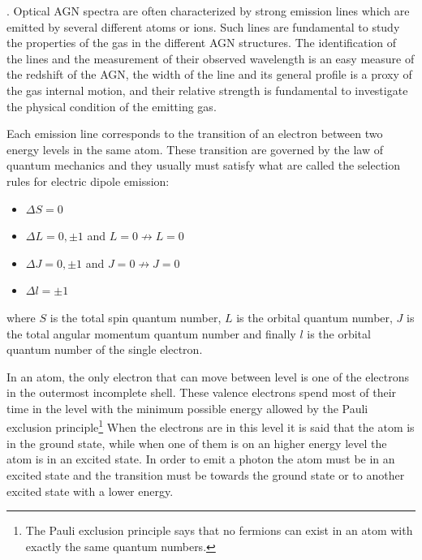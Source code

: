 \documentclass[../main.tex]{subfiles}
\begin{document}
.
Optical AGN spectra are often characterized by strong emission lines which are emitted by several different atoms or ions.
Such lines are fundamental to study the properties of the gas in the different AGN structures.
The identification of the lines and the measurement of their observed wavelength is an easy measure of the redshift of the AGN, the width of the line and its general profile is a proxy of the gas internal motion, and their relative strength is fundamental to investigate the physical condition of the emitting gas.

Each emission line corresponds to the transition of an electron between two energy levels in the same atom.
These transition are governed by the law of quantum mechanics and they usually must satisfy what are called the selection rules for electric dipole emission:
\begin{itemize}
    \item $\Delta S = 0$
    \item $\Delta L = 0,\pm1$ and $L =0 \not\to L=0$
    \item $\Delta J = 0, \pm 1$ and $J=0 \not\to J=0$
    \item $\Delta l = \pm 1$
\end{itemize}
where $S$ is the total spin quantum number, $L$ is the orbital quantum number, $J$ is the total angular momentum quantum number and finally $l$ is the orbital quantum number of the single electron. 

In an atom, the only electron that can move between level is one of the electrons in the outermost incomplete shell. 
These valence electrons spend most of their time in the level with the minimum possible energy allowed by the Pauli exclusion principle\footnote{The Pauli exclusion principle says that no fermions can exist in an atom with exactly the same quantum numbers.}
When the electrons are in this level it is said that the atom is in the ground state, while when one of them is on an higher energy level the atom is in an excited state.
In order to emit a photon the atom must be in an excited state and the transition must be towards the ground state or to another excited state with a lower energy.
\end{document}
